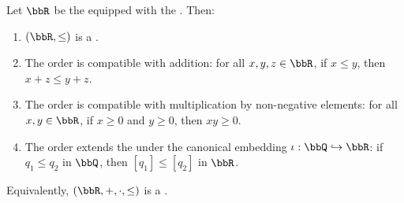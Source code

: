 \begin{proposition} \label{proposition:real_numbers_form_ordered_field}
    Let $\bbR$ be the  equipped with the . Then:
    \begin{enumerate}
        \item $(\bbR, \le)$ is a .
        \item The order is compatible with addition: for all $x, y, z \in \bbR$, if $x \le y$, then $x + z \le y + z$.
        \item The order is compatible with multiplication by non-negative elements: for all $x, y \in \bbR$, if $x \ge 0$ and $y \ge 0$, then $xy \ge 0$.
        \item The order extends the  under the canonical embedding $\iota: \bbQ \hookrightarrow \bbR$: if $q_1 \le q_2$ in $\bbQ$, then $[q_1] \le [q_2]$ in $\bbR$.
    \end{enumerate}
    Equivalently, $(\bbR, +, \cdot, \le)$ is a .
\end{proposition}

